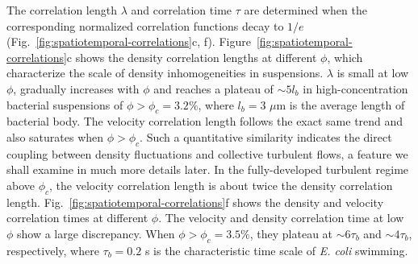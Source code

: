 The correlation length $\lambda$ and correlation time $\tau$ are determined when the corresponding normalized correlation functions decay to $1/e$ (Fig.~\ref{fig:spatiotemporal-correlations}c, f). Figure~\ref{fig:spatiotemporal-correlations}c shows the density correlation lengths at different $\phi$, which characterize the scale of density inhomogeneities in suspensions.
$\lambda$ is small at low $\phi$, gradually increases with $\phi$ and reaches a plateau of $\sim 5l_b$ in high-concentration bacterial suspensions of $\phi > \phi_c = 3.2\%$, where $l_b=3$ $\mu$m is the average length of bacterial body. The velocity correlation length follows the exact same trend and also saturates when $\phi > \phi_c$. Such a quantitative similarity indicates the direct coupling between density fluctuations and collective turbulent flows, a feature we shall examine in much more details later. In the fully-developed turbulent regime above $\phi_c$, the velocity correlation length is about twice the density correlation length.
Fig.~\ref{fig:spatiotemporal-correlations}f shows the density and velocity correlation times at different $\phi$. The velocity and density correlation time at low $\phi$ show a large discrepancy. When $\phi > \phi_c=3.5\%$, they plateau at $\sim 6\tau_b$ and $\sim 4\tau_b$, respectively, where $\tau_b=0.2$ s is the characteristic time scale of \textit{E. coli} swimming.


